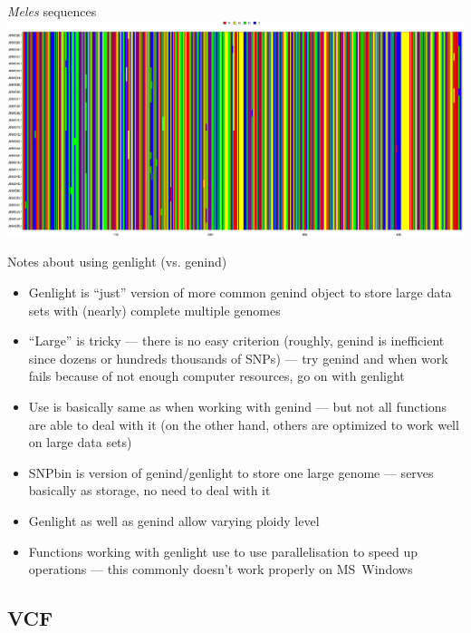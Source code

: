 \documentclass[compress, ucs, xelatex, 11pt, xcolor=svgnames,
	hyperref={
		bookmarks=true,
		unicode=true,
		colorlinks=true,
		pdftitle={Molecular data in R},
		plainpages=false,
		pdfauthor={Vojtech Zeisek},
		pdfsubject={Course about phylogeny and evolution in R},
		pdfcreator={XeLaTeX},
		pdfkeywords={R, evolution, phylogeny, molecular data},
		linkcolor=Tomato,
		anchorcolor=SaddleBrown,
		citecolor=Goldenrod,
		filecolor=DarkMagenta,
		menucolor=Sienna,
		urlcolor=DarkTurquoise,
		pdftex},
	url={hyphens, lowtilde} %
	]{beamer}
\begin{document}
\begin{frame}{\textit{Meles} sequences}
	\includegraphics[width=\textwidth]{sequences_meles.png}
\end{frame}

\begin{frame}{Notes about using genlight (vs. genind)}
	\begin{itemize}
		\item Genlight is ``just'' version of more common genind object to store large data sets with (nearly) complete multiple genomes
		\item ``Large'' is tricky --- there is no easy criterion (roughly, genind is inefficient since dozens or hundreds thousands of SNPs) --- try genind and when work fails because of not enough computer resources, go on with genlight
		\item Use is basically same as when working with genind --- but not all functions are able to deal with it (on the other hand, others are optimized to work well on large data sets)
		\item SNPbin is version of genind/genlight to store one large genome --- serves basically as storage, no need to deal with it
		\item Genlight as well as genind allow varying ploidy level
		\item Functions working with genlight use to use parallelisation to speed up operations --- this commonly doesn't work properly on MS~Windows
	\end{itemize}
\end{frame}

\subsection{VCF}
\end{document}
